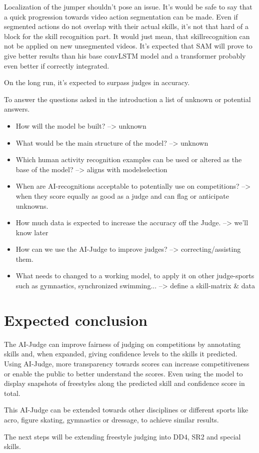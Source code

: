 Localization of the jumper shouldn't pose an issue. It's would be safe to say that a quick progression towards video action segmentation can be made. Even if segmented actions do not overlap with their actual skills, it's not that hard of a block for the skill recognition part. It would just mean, that skillrecognition can not be applied on new unsegmented videos.
It's expected that SAM will prove to give better results than his base convLSTM model and a transformer probably even better if correctly integrated.

On the long run, it's expected to surpass judges in accuracy.

To answer the questions asked in the introduction a list of unknown or potential answers.

\begin{itemize}
    \item How will the model be built? --> unknown
    \item What would be the main structure of the model? --> unknown
    \item Which human activity recognition examples can be used or altered as the base of the model? --> aligns with modelselection
    \item When are AI-recognitions acceptable to potentially use on competitions? --> when they score equally as good as a judge and can flag or anticipate unknowns.
    \item How much data is expected to increase the accuracy off the Judge. --> we'll know later
    \item How can we use the AI-Judge to improve judges? --> correcting/assisting them.
    \item What needs to changed to a working model, to apply it on other judge-sports such as gymnastics, synchronized swimming... --> define a skill-matrix \& data
\end{itemize}


\section{Expected conclusion}%
\label{proposal-sec:conclusion}

The AI-Judge can improve fairness of judging on competitions by annotating skills and, when expanded, giving confidence levels to the skills it predicted. Using AI-Judge, more transparency towards scores can increase competitiveness or enable the public to better understand the scores. Even using the model to display snapshots of freestyles along the predicted skill and confidence score in total.

This AI-Judge can be extended towards other disciplines or different sports like acro, figure skating, gymnastics or dressage, to achieve similar results.

The next steps will be extending freestyle judging into DD4, SR2 and special skills.
